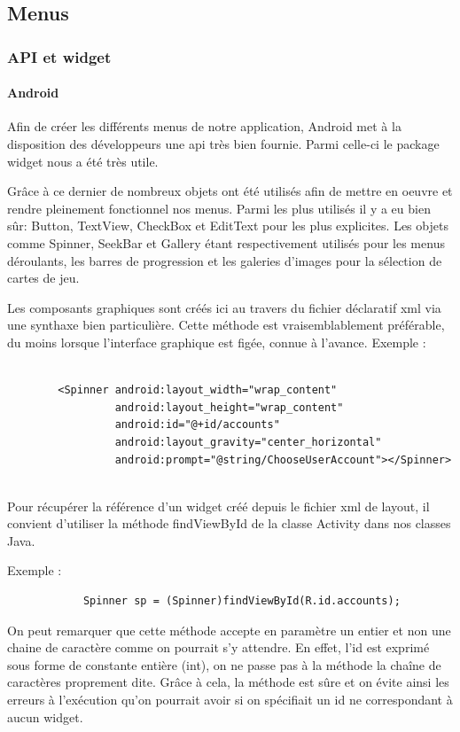 \subsection{Menus}
	\subsubsection{API et widget}
	\paragraph{Android\\}
		Afin de créer les différents menus de notre application, Android met à la
		disposition des développeurs une \gls{api} très bien fournie. Parmi celle-ci le package \gls{widget}
		nous a été très utile. 
		
		Grâce à ce dernier de nombreux objets ont été utilisés
		afin de mettre en oeuvre et rendre pleinement fonctionnel nos menus.
		Parmi les plus utilisés il y a eu bien sûr: Button, TextView, CheckBox et
		EditText pour les plus explicites. Les objets comme Spinner, SeekBar et
		Gallery étant respectivement utilisés pour les menus déroulants, les barres de
		progression et les galeries d'images pour la sélection de cartes de jeu.
		
		Les composants graphiques sont créés ici au travers du fichier déclaratif
		\gls{xml} via une synthaxe bien particulière. Cette méthode est vraisemblablement
		préférable, du moins lorsque l’interface graphique est figée, connue à l’avance. 
		Exemple :
		\begin{verbatim}
		
		<Spinner android:layout_width="wrap_content"
				 android:layout_height="wrap_content"
				 android:id="@+id/accounts"
				 android:layout_gravity="center_horizontal"
				 android:prompt="@string/ChooseUserAccount"></Spinner>
				
		\end{verbatim}		
		
		
		Pour récupérer la référence d’un widget créé depuis le
		fichier xml de layout, il convient d’utiliser la méthode findViewById de la
		classe Activity dans nos classes Java.
		
		Exemple :
		\begin{verbatim}
			Spinner sp = (Spinner)findViewById(R.id.accounts);
		\end{verbatim}
		
		On peut remarquer que cette méthode accepte en paramètre un entier et non une
		chaine de caractère  comme on pourrait s’y attendre. En effet, l’id est exprimé sous forme de constante entière (int), on
		ne passe pas à la méthode la chaîne de caractères proprement dite. Grâce à cela, la
		méthode est sûre et on évite ainsi les erreurs à l’exécution qu’on pourrait avoir si on
		spécifiait un id ne correspondant à aucun widget.
		
